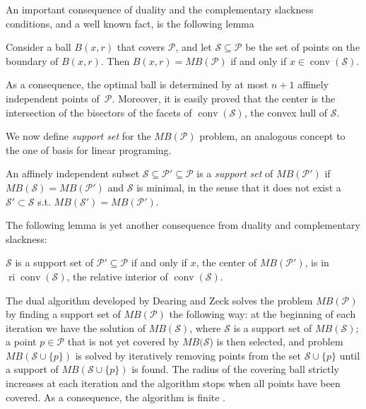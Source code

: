 \noindent An important consequence of duality and the complementary slackness conditions, and a well known fact, is the following lemma

\begin{lemma}\label{lem:convhull} 
Consider a ball $B(x,r)$ that covers ${\mathcal{P}}$, and let ${\mathcal{S}}\subseteq{\mathcal{P}}$ be the set of points on the boundary of $B(x,r)$. Then $B(x,r)=MB({\mathcal{P}})$ if and only if $x\in{\operatorname{conv}}({\mathcal{S}})$.
\end{lemma}

\noindent As a consequence, the optimal ball is determined by at most $n+1$ affinely independent points of~${\mathcal{P}}$. Moreover, it is easily proved that the center is the intersection of the bisectors of the facets of ${\operatorname{conv}}({\mathcal{S}})$, the convex hull of ${\mathcal{S}}$.

\medskip

We now define \emph{support set} for the $MB({\mathcal{P}})$ problem, an analogous concept to the one of basis for linear programing. 

\begin{definition}
	An affinely independent subset ${\mathcal{S}}\subseteq{\mathcal{P}}'\subseteq{\mathcal{P}}$ is a \emph{support set} of $MB({\mathcal{P}}')$ if $MB({\mathcal{S}}) = MB({\mathcal{P}}')$ and ${\mathcal{S}}$ is minimal, in the sense that it does not exist a ${\mathcal{S}}'\subset{\mathcal{S}}$ s.t. $MB({\mathcal{S}}')=MB({\mathcal{P}}')$.
\end{definition}

\noindent The following lemma is yet another consequence from duality and complementary slackness:

\begin{lemma}\label{lem:suppset}
${\mathcal{S}}$ is a support set of ${\mathcal{P}}'\subseteq{\mathcal{P}}$ if and only if $x$, the center of $MB({\mathcal{P}}')$, is in ${\operatorname{ri}}{\operatorname{conv}}({\mathcal{S}})$, the relative interior of ${\operatorname{conv}}({\mathcal{S}})$. 
\end{lemma}

The dual algorithm developed by Dearing and Zeck \cite{Dearing09} solves the problem $MB({\mathcal{P}})$ by finding a support set of $MB({\mathcal{P}})$ the following way: at the beginning of each iteration we have the solution of $MB({\mathcal{S}})$, where ${\mathcal{S}}$ is a support set of $MB({\mathcal{S}})$; a point $p\in{\mathcal{P}}$ that is not yet covered by $MB({\mathcal{S}}$) is then selected, and problem $MB({\mathcal{S}}\cup\{p\})$ is solved by iteratively removing points from the set ${\mathcal{S}}\cup\{p\}$ until a support of $MB({\mathcal{S}}\cup\{p\})$ is found. The radius of the covering ball strictly increases at each iteration and the algorithm stops when all points have been covered. As a consequence, the algorithm is finite \cite[Theo. 3.2]{Dearing09}.

